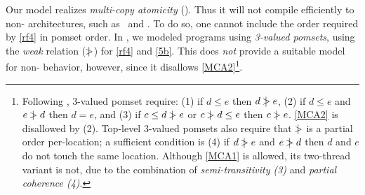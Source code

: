 
Our model realizes \emph{multi-copy atomicity} (\mca).  Thus it will not
compile efficiently to non-\mca{} architectures, such as \ppc\ and \armseven.
To do so, one cannot include the order required by \ref{rf4} in pomset order.
In \cite{2019-sp}, we modeled programs using \emph{3-valued pomsets}, using
the \emph{weak} relation ($\mathrel{\,\mid\!\!\!>}$) for \ref{rf4} and \ref{5b}.  This does
\emph{not} provide a suitable model for non-\mca{} behavior, however, since
it disallows \ref{MCA2}\footnote{Following \cite{DBLP:journals/dc/Lamport86},
  3-valued pomset require: (1) if $d\leq e$ then $d\mathrel{\,\mid\!\!\!>} e$, (2) if
  $d\leq e$ and $e\mathrel{\,\mid\!\!\!>} d$ then $d=e$, and (3) if $c\leq d \mathrel{\,\mid\!\!\!>} e$ or
  $c\mathrel{\,\mid\!\!\!>} d\leq e$ then $c\mathrel{\,\mid\!\!\!>} e$.  \ref{MCA2} is disallowed by (2).
  Top-level 3-valued pomsets also require that $\mathrel{\,\mid\!\!\!>}$ is a partial order
  per-location; a sufficient condition is (4) if $d\mathrel{\,\mid\!\!\!>} e$ and $e\mathrel{\,\mid\!\!\!>} d$
  then $d$ and $e$ do not touch the same location.  Although \ref{MCA1} is
  allowed, its two-thread variant is not, due to the combination of
  \emph{semi\hyp{}transitivity (3)} and \emph{partial coherence (4)}.}.




